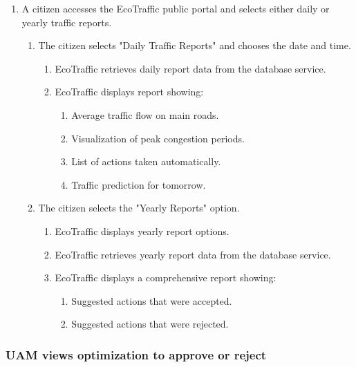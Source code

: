 \documentclass[12pt, a4paper, twoside, openright]{report}
\begin{document}
\begin{enumerate}
\item
  A citizen accesses the EcoTraffic public portal and selects either daily or yearly traffic reports.

  \begin{enumerate}
  \item
  The citizen selects "Daily Traffic Reports" and chooses the date and
    time.
    \begin{enumerate}
    \item
      EcoTraffic retrieves daily report data from the database service.
    \item
      EcoTraffic displays report showing:

  \begin{enumerate}
        \def\labelenumiv{\alph{enumiv}.}
        \item
          Average traffic flow on main roads.
        \item
          Visualization of peak congestion periods.
        \item
          List of actions taken automatically.
        \item
          Traffic prediction for tomorrow.
        \end{enumerate}
      \end{enumerate}
    \item
    The citizen selects the "Yearly Reports" option.
  
      \begin{enumerate}
      \item
        EcoTraffic displays yearly report options.
      \item
        EcoTraffic retrieves yearly report data from the database service.
      \item
        EcoTraffic displays a comprehensive report showing:
  
        \begin{enumerate}
        \def\labelenumiv{\alph{enumiv}.}
        \item
          Suggested actions that were accepted.
        \item
          Suggested actions that were rejected.
        \end{enumerate}
      \end{enumerate}
    \end{enumerate}
  \end{enumerate}

\subsubsection{UAM views optimization to approve or reject}\label{subsubsec:uam-views}
\end{document}
